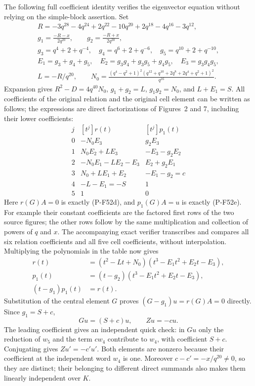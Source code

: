 The following full coefficient identity verifies the eigenvector
equation without relying on the simple-block assertion. Set
\[
 \begin{gathered}
 R=-3q^{28}-4q^{24}+2q^{22}-10q^{20}+2q^{18}-4q^{16}-3q^{12},\\
 g_1=\frac{-R-x}{2q^{20}},\qquad
 g_2=\frac{-R+x}{2q^{20}},\\
 g_3=q^4+2+q^{-4},\quad g_4=q^6+2+q^{-6},\quad
 g_5=q^{10}+2+q^{-10},\\
 E_1=g_3+g_4+g_5,\quad E_2=g_3g_4+g_3g_5+g_4g_5,\quad
 E_3=g_3g_4g_5,\\
 L=-R/q^{20},\qquad
 N_0=\frac{(q^4-q^2+1)^2
             (q^{12}+q^{10}+2q^8+2q^4+q^2+1)^2}{q^{16}}.
 \end{gathered}                                                 \tag{P-F52f1}
\]
Expansion gives $R^2-D=4q^{40}N_0$, $g_1+g_2=L$,
$g_1g_2=N_0$, and $L+E_1=S$. All coefficients of the
original relation and the original cell element can be written
as follows; the expressions are direct factorizations of
Figures~2 and 7, including their lower coefficients:
\[
\begin{array}{c|c|c}
 j&[t^j]r(t)&[t^j]p_1(t)\\ \hline
 0&-N_0E_3&g_2E_3\\
 1&N_0E_2+LE_3&-E_3-g_2E_2\\
 2&-N_0E_1-LE_2-E_3&E_2+g_2E_1\\
 3&N_0+LE_1+E_2&-E_1-g_2=c\\
 4&-L-E_1=-S&1\\
 5&1&0
\end{array}                                                     \tag{P-F52f2}
\]
Here $r(G)A=0$ is exactly (P-F52d), and $p_1(G)A=u$
is exactly (P-F52e). For example their constant coefficients
are the factored first rows of the two source figures; the
other rows follow by the same multiplication and collection
of powers of $q$ and $x$. The accompanying exact verifier
transcribes and compares all six relation coefficients and
all five cell coefficients, without interpolation.
Multiplying the polynomials in the table now gives
\[
 \begin{split}
 r(t)&=(t^2-Lt+N_0)(t^3-E_1t^2+E_2t-E_3),\\
 p_1(t)&=(t-g_2)(t^3-E_1t^2+E_2t-E_3),\\
                 (t-g_1)p_1(t)&=r(t).
 \end{split}                                                    \tag{P-F52f3}
\]
Substitution of the central element $G$ proves
$(G-g_1)u=r(G)A=0$ directly. Since $g_1=S+c$,
\[
                 Gu=(S+c)u,\qquad Zu=-cu.                     \tag{P-F52f}
\]
The leading coefficient gives an independent quick check:
in $Gu$ only the reduction of $w_5$ and the term $cw_4$
contribute to $w_4$, with coefficient $S+c$.
Conjugating gives $Zu'=-c'u'$. Both elements are nonzero because
their coefficient at the independent word $w_4$ is one.
Moreover $c-c'=-x/q^{20}\ne0$, so they are distinct; their
belonging to different direct summands also makes them
linearly independent over $K$.

